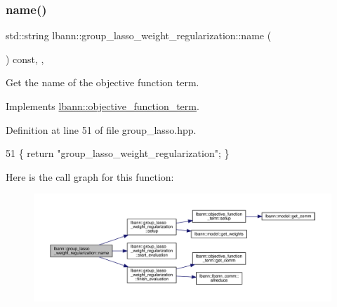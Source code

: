 \subsubsection{\texorpdfstring{name()}{name()}}
{\footnotesize\ttfamily std\+::string lbann\+::group\+\_\+lasso\+\_\+weight\+\_\+regularization\+::name (\begin{DoxyParamCaption}{ }\end{DoxyParamCaption}) const\hspace{0.3cm}{\ttfamily [inline]}, {\ttfamily [override]}, {\ttfamily [virtual]}}

Get the name of the objective function term. 

Implements \hyperlink{classlbann_1_1objective__function__term_a964fbfad3dd0434aa8f32c5fedf1079a}{lbann\+::objective\+\_\+function\+\_\+term}.



Definition at line 51 of file group\+\_\+lasso.\+hpp.


\begin{DoxyCode}
51 \{ \textcolor{keywordflow}{return} \textcolor{stringliteral}{"group\_lasso\_weight\_regularization"}; \}
\end{DoxyCode}
Here is the call graph for this function\+:\nopagebreak
\begin{figure}[H]
\begin{center}
\leavevmode
\includegraphics[width=350pt]{classlbann_1_1group__lasso__weight__regularization_a1cd895144b2816592ceeecd4d2f7a1d1_cgraph}
\end{center}
\end{figure}
\mbox{\label{classlbann_1_1group__lasso__weight__regularization_aaf1af923c624618ab823c7ac73bc4333}} 
